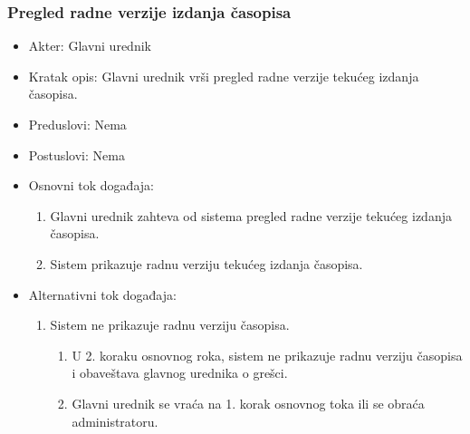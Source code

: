 \documentclass[a4paper]{article}
\begin{document}
\subsubsection{Pregled radne verzije izdanja časopisa}
\begin{itemize}
    \item Akter: Glavni urednik
    \item Kratak opis: Glavni urednik vrši pregled radne verzije tekućeg izdanja časopisa.
    \item Preduslovi: Nema
    \item Postuslovi: Nema
    \item Osnovni tok događaja:
        \begin{enumerate}
            \item Glavni urednik zahteva od sistema pregled radne verzije tekućeg izdanja časopisa.
            \item Sistem prikazuje radnu verziju tekućeg izdanja časopisa.
        \end{enumerate}
    \item Alternativni tok događaja:
        \begin{enumerate}
            \item Sistem ne prikazuje radnu verziju časopisa.
            \begin{enumerate}
                \item U 2. koraku osnovnog roka, sistem ne prikazuje radnu verziju časopisa i obaveštava glavnog urednika o grešci.
                \item Glavni urednik se vraća na 1. korak osnovnog toka ili se obraća administratoru.
            \end{enumerate}
        \end{enumerate}
\end{itemize}
\end{document}
